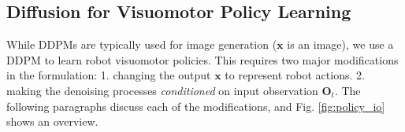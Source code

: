 \documentclass[Afour,sageh,times]{sagej}
\begin{document}



\subsection{Diffusion for Visuomotor Policy Learning} 

While DDPMs are typically used for image generation ($\mathbf{x}$ is an image), we use a DDPM to learn robot visuomotor policies. This requires two major modifications in the formulation: 
1. changing the output $\mathbf{x}$  to represent robot actions.  
2. making the denoising processes \textit{conditioned} on input observation $\mathbf{O}_t$. 
The following paragraphs discuss each of the modifications, and Fig. \ref{fig:policy_io} shows an overview. 
\end{document}
